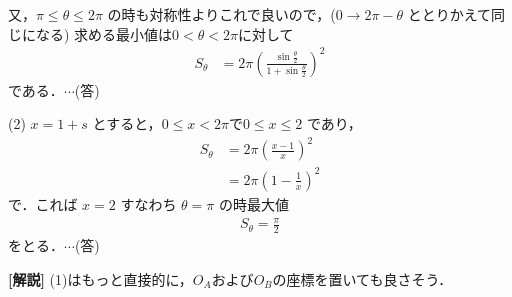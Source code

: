 \documentclass[a4paper,10pt]{ltjsarticle}
\begin{document}
\begin{multicols}{2}
  又，$\pi \le \theta \le 2\pi$ の時も対称性よりこれで良いので，($0 \to 2\pi-\theta$ ととりかえて同じになる)
  求める最小値は$0<\theta<2\pi$に対して
  \begin{align*}
    S_\theta
     & = 2\pi \left(\frac{\sin\frac{\theta}{2}}{1+\sin\frac{\theta}{2}}\right)^2
  \end{align*}
  である．$\cdots$(答)

  \vspace{10pt}
  (2) $x=1+s$ とすると，$0\le x < 2\pi$で$0 \le x \le 2$ であり，
  \begin{align*}
    S_\theta
     & = 2\pi \left(\frac{x-1}{x}\right)^2 \\
     & = 2\pi \left(1-\frac{1}{x}\right)^2
  \end{align*}
  で．これば $x=2$ すなわち $\theta=\pi$ の時最大値
  \begin{align*}
    S_\theta = \frac{\pi}{2}
  \end{align*}
  をとる．$\cdots$(答)


  \vspace{10pt}
  {\bf[解説]}
  (1)はもっと直接的に，$O_A$および$O_B$の座標を置いても良さそう．
  \newpage
\end{multicols}
\end{document}
